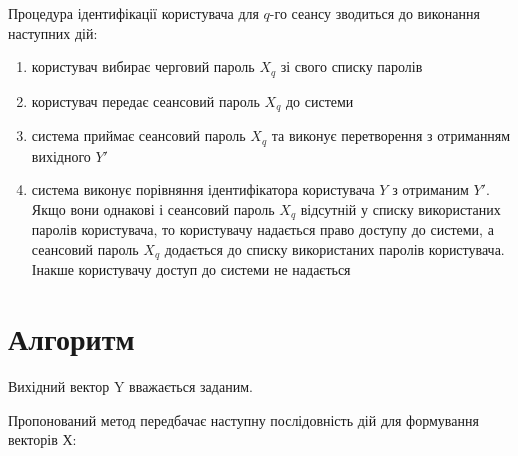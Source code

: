\documentclass[12pt]{article}
\begin{document}
Процедура ідентифікації користувача для $q$-го сеансу зводиться до виконання наступних дій:
\begin{enumerate}
\itemsep=0em
\item користувач вибирає черговий пароль $X_q$ зі свого списку паролів
\item користувач передає сеансовий пароль $X_q$ до системи
\item система приймає сеансовий пароль $X_q$ та виконує перетворення з отриманням вихідного $Y'$
\item система виконує порівняння ідентифікатора користувача  $Y$ з отриманим $Y'$. Якщо вони однакові і сеансовий пароль $X_q$ відсутній у списку використаних паролів користувача, то користувачу надається право доступу до системи, а сеансовий пароль $X_q$ додається до списку використаних паролів користувача. Інакше користувачу доступ до системи не надається
\end{enumerate}

\section{Алгоритм}

Вихідний вектор Y вважається заданим.

Пропонований метод передбачає наступну послідовність дій для формування векторів Х:
\end{document}
